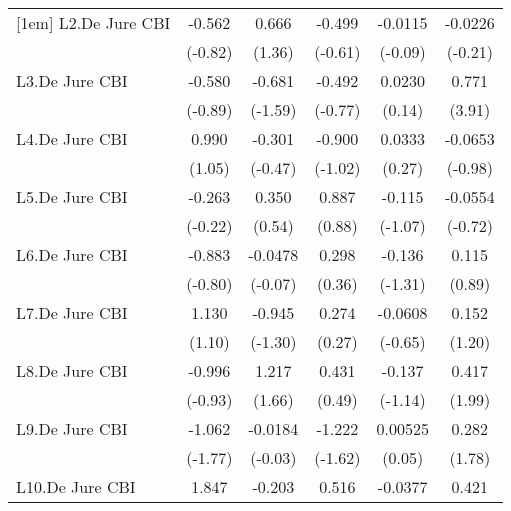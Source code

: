 {\begin{longtable}{l*{5}{c}}
[1em]
L2.De Jure CBI  &   -0.562         &    0.666         &   -0.499         &  -0.0115         &  -0.0226         \\
                &  (-0.82)         &   (1.36)         &  (-0.61)         &  (-0.09)         &  (-0.21)         \\
[1em]
L3.De Jure CBI  &   -0.580         &   -0.681         &   -0.492         &   0.0230         &    0.771\sym{***}\\
                &  (-0.89)         &  (-1.59)         &  (-0.77)         &   (0.14)         &   (3.91)         \\
[1em]
L4.De Jure CBI  &    0.990         &   -0.301         &   -0.900         &   0.0333         &  -0.0653         \\
                &   (1.05)         &  (-0.47)         &  (-1.02)         &   (0.27)         &  (-0.98)         \\
[1em]
L5.De Jure CBI  &   -0.263         &    0.350         &    0.887         &   -0.115         &  -0.0554         \\
                &  (-0.22)         &   (0.54)         &   (0.88)         &  (-1.07)         &  (-0.72)         \\
[1em]
L6.De Jure CBI  &   -0.883         &  -0.0478         &    0.298         &   -0.136         &    0.115         \\
                &  (-0.80)         &  (-0.07)         &   (0.36)         &  (-1.31)         &   (0.89)         \\
[1em]
L7.De Jure CBI  &    1.130         &   -0.945         &    0.274         &  -0.0608         &    0.152         \\
                &   (1.10)         &  (-1.30)         &   (0.27)         &  (-0.65)         &   (1.20)         \\
[1em]
L8.De Jure CBI  &   -0.996         &    1.217         &    0.431         &   -0.137         &    0.417\sym{*}  \\
                &  (-0.93)         &   (1.66)         &   (0.49)         &  (-1.14)         &   (1.99)         \\
[1em]
L9.De Jure CBI  &   -1.062         &  -0.0184         &   -1.222         &  0.00525         &    0.282         \\
                &  (-1.77)         &  (-0.03)         &  (-1.62)         &   (0.05)         &   (1.78)         \\
[1em]
L10.De Jure CBI &    1.847\sym{***}&   -0.203         &    0.516         &  -0.0377         &    0.421         \\

\end{longtable}}
